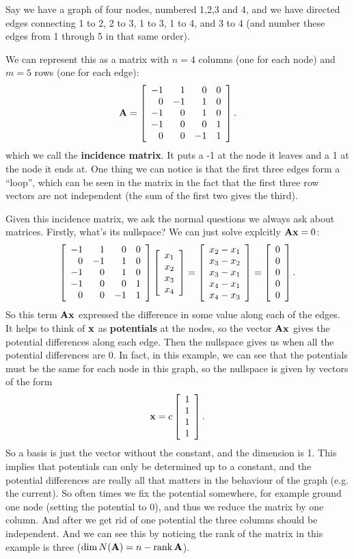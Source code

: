 
\bex
Say we have a graph of four nodes, numbered 1,2,3 and 4, and we have directed edges connecting 1 to 2, 2 to 3, 1 to 3, 1 to 4, and 3 to 4 (and number these edges from 1 through 5 in that same order). 

We can represent this as a matrix with $n=4$ columns (one for each node) and $m=5$ rows (one for each edge):
\[ \boldsymbol{\mathbf{A}} = \left[ \begin{array}{rrrrrrrrrrrrrrrrrrrrrrrrr} -1&1&0&0\\0&-1&1&0\\-1&0&1&0\\-1&0&0&1\\0&0&-1&1\\ \end{array} \right] .\]
which we call the \textbf{incidence matrix}. It puts a -1 at the node it leaves and a 1 at the node it ends at. One thing we can notice is that the first three edges form a ``loop'', which can be seen in the matrix in the fact that the first three row vectors are not independent (the sum of the first two gives the third). 

Given this incidence matrix, we ask the normal questions we always ask about matrices. Firstly, what's its nullspace? We can just solve explcitly $\boldsymbol{\mathbf{A}}\boldsymbol{\mathbf{x}} = 0$:
\[ \left[ \begin{array}{rrrrrrrrrrrrrrrrrrrrrrrrr} -1&1&0&0\\0&-1&1&0\\-1&0&1&0\\-1&0&0&1\\0&0&-1&1\\ \end{array} \right]\left[ \begin{array}{rrrrrrrrrrrrrrrrrrrrrrrrr} x_1\\x_2\\x_3\\x_4\\ \end{array} \right] = \left[ \begin{array}{rrrrrrrrrrrrrrrrrrrrrrrrr} x_2-x_1\\x_3-x_2\\x_3-x_1\\x_4-x_1\\x_4-x_3\\ \end{array} \right] = \left[ \begin{array}{rrrrrrrrrrrrrrrrrrrrrrrrr} 0\\0\\0\\0\\0\\ \end{array} \right]. \]
So this term $\boldsymbol{\mathbf{A}}\boldsymbol{\mathbf{x}}$ expressed the difference in some value along each of the edges. It helps to think of $\boldsymbol{\mathbf{x}}$ as \textbf{potentials} at the nodes, so the vector $\boldsymbol{\mathbf{A}}\boldsymbol{\mathbf{x}}$ gives the potential differences along each edge. Then the nullspace gives us when all the potential differences are 0. In fact, in this example, we can see that the potentials must be the same for each node in this graph, so the nullspace is given by vectors of the form
\[ \boldsymbol{\mathbf{x}} = c\left[ \begin{array}{rrrrrrrrrrrrrrrrrrrrrrrrr} 1\\1\\1\\1\\ \end{array} \right]. \]
So a basis is just the vector without the constant, and the dimension is 1. 
\brm
This implies that potentials can only be determined up to a constant, and the potential differences are really all that matters in the behaviour of the graph (e.g. the current). So often times we fix the potential somewhere, for example ground one node (setting the potential to 0), and thus we reduce the matrix by one column. And after we get rid of one potential the three columns should be independent. And we can see this by noticing the rank of the matrix in this example is three ($\mathrm{dim}\, N(\boldsymbol{\mathbf{A}}) = n - \mathrm{rank}\, \boldsymbol{\mathbf{A}}$). 
\erm


